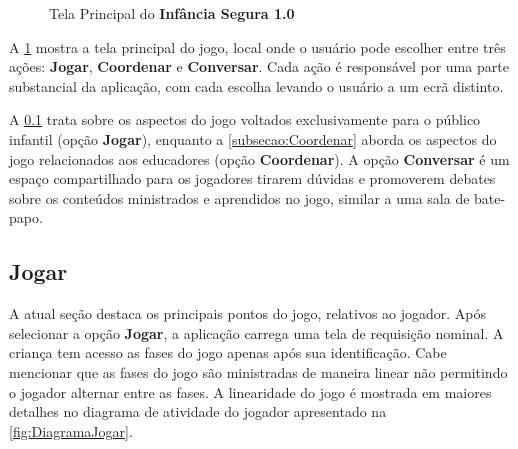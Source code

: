 \documentclass[alpha-refs,brazilian]{RBCA_v2.0}
\begin{document}
\begin{figure}[h]
  \centering
  \caption{Tela Principal do \textbf{Infância Segura 1.0}}
  \label{fig:JogoOriginal}
\end{figure}

A \cref{fig:JogoOriginal} mostra a tela principal do jogo, local onde o usuário pode escolher entre três ações: \textbf{Jogar}, \textbf{Coordenar} e \textbf{Conversar}. Cada ação é responsável por uma parte substancial da aplicação, com cada escolha levando o usuário a um ecrã distinto.

A \cref{subsecao:Jogar} trata sobre os aspectos do jogo voltados exclusivamente para o público infantil (opção \textbf{Jogar}), enquanto a \cref{subsecao:Coordenar} aborda os aspectos do jogo relacionados aos educadores (opção \textbf{Coordenar}). A opção \textbf{Conversar} é um espaço compartilhado para os jogadores tirarem dúvidas e promoverem debates sobre os conteúdos ministrados e aprendidos no jogo, similar a uma sala de bate-papo.

\subsection{Jogar}\label{subsecao:Jogar}

A atual seção destaca os principais pontos do jogo, relativos ao jogador. Após selecionar a opção \textbf{Jogar}, a aplicação carrega uma tela de requisição nominal. A criança tem acesso as fases do jogo apenas após sua identificação. Cabe mencionar que as fases do jogo são ministradas de maneira linear não permitindo o jogador alternar entre as fases. A linearidade do jogo é mostrada em maiores detalhes no diagrama de atividade do jogador apresentado na \cref{fig:DiagramaJogar}.
\end{document}
